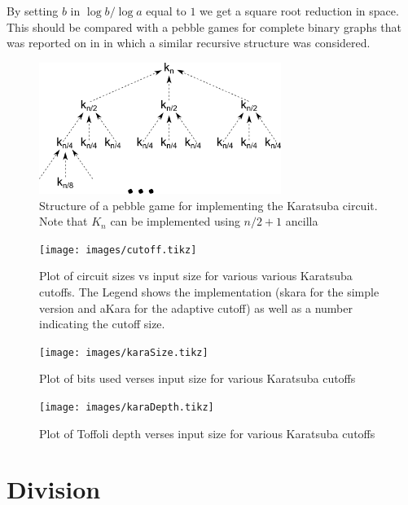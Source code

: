By setting $b$ in $\log b / \log a$ equal to $1$ we get a square root reduction
in space. This should be compared with a pebble games for complete binary
graphs that was reported on in \cite{peb16} in which a similar recursive
structure was considered.



      \begin{figure}[p]
        \capstart
        \centering
        \includegraphics[width=0.7\textwidth]{images/kara-mdd}
        \caption{Structure of a pebble game for implementing the Karatsuba circuit. Note that $K_n$ can be implemented using $n/2+1$ ancilla}
        \label{fig:kara-mdd}
      \end{figure}

     \begin{figure}[p]
        \capstart
        \texttt{[image: images/cutoff.tikz]}
        \caption{Plot of circuit sizes vs input size for various various Karatsuba cutoffs.
                 The Legend shows the implementation (skara for the simple version and aKara for the adaptive cutoff) as well as a number indicating the cutoff size. }
        \label{fig:cutoff}
      \end{figure}

      \begin{figure}[p]
        \capstart
        \texttt{[image: images/karaSize.tikz]}
        \caption{Plot of bits used verses input size for various Karatsuba cutoffs}
        \label{fig:size}
      \end{figure}
      \begin{figure}[p]
        \capstart
        \texttt{[image: images/karaDepth.tikz]}
        \caption{Plot of Toffoli depth verses input size for various Karatsuba cutoffs}
        \label{fig:depth}
      \end{figure}

\section{Division}
